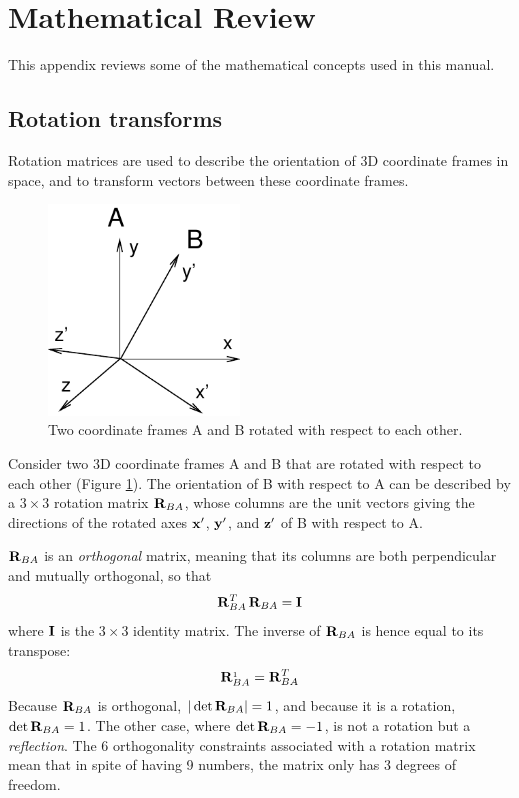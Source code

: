 \appendix

\section{Mathematical Review}

This appendix reviews some of the mathematical concepts used in this
manual.

\subsection{Rotation transforms}
\label{Rotations:sec}

Rotation matrices are used to describe the orientation of 3D
coordinate frames in space, and to transform vectors between these
coordinate frames.

\begin{figure}[t]
\begin{center}
\includegraphics[width=2in]{images/rotationAB}
\end{center}
\caption{Two coordinate frames A and B rotated with respect
to each other.}
\label{rotationAB:fig}
\end{figure}

Consider two 3D coordinate frames A and B that are rotated with
respect to each other (Figure \ref{rotationAB:fig}).  The orientation
of B with respect to A can be described by a $3 \times 3$ rotation
matrix ${\bf R}_{BA}$, whose columns are the unit vectors giving the
directions of the rotated axes ${\bf x}'$, ${\bf y}'$, and ${\bf z}'$ of B with
respect to A.

${\bf R}_{BA}$ is an {\it orthogonal} matrix, meaning that
its columns are both perpendicular and mutually
orthogonal, so that
%
\begin{equation}
{\bf R}_{BA}^T \, {\bf R}_{BA} = {\bf I}
\end{equation}
%
where ${\bf I}$ is the $3 \times 3$ identity matrix. The inverse
of ${\bf R}_{BA}$ is hence equal to its transpose:
%
\begin{equation}
{\bf R}_{BA}^{_1} = {\bf R}_{BA}^T
\label{RABinv:eqn}
\end{equation}
%
Because ${\bf R}_{BA}$ is orthogonal, $|\det {\bf R}_{BA}| = 1$, and because it
is a rotation, $\det {\bf R}_{BA} = 1$. The other case, where $\det {\bf R}_{BA}
= -1$, is not a rotation but a {\it reflection}.
The 6 orthogonality constraints associated with a rotation matrix mean
that in spite of having 9 numbers, the matrix only has 3 degrees of
freedom.

